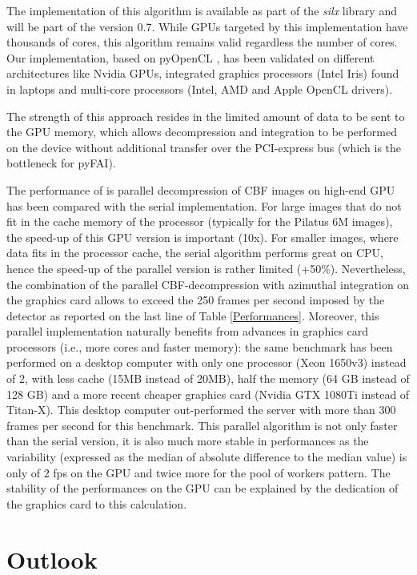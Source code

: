 \documentclass[preprint]{iucr}              %
\begin{document}
The implementation of this algorithm is available as part of the \textit{silx}
\cite{silx} library and will be part of the version 0.7.
While GPUs targeted by this implementation have thousands of
cores, this algorithm remains valid regardless the
number of cores.
Our implementation, based on pyOpenCL \cite{pyopencl}, 
has been validated on different architectures like Nvidia GPUs,
integrated graphics processors (Intel Iris) found in laptops and multi-core
processors (Intel, AMD and Apple OpenCL drivers).

The strength of this approach resides in the limited amount of
data to be sent to the GPU memory, which allows decompression and
integration to be performed on the device without additional
transfer over the PCI-express bus (which is the bottleneck for pyFAI).

The performance of is parallel decompression of CBF images on high-end GPU has
been compared with the serial implementation. 
For large images that do not fit in the cache memory of the
processor (typically for the Pilatus 6M images), the speed-up of this GPU
version is important (10x).
For smaller images, where data fits in the processor cache, the serial
algorithm performs great on CPU, hence the speed-up of the parallel version is
rather limited (+50\%). 
Nevertheless, the combination of the parallel CBF-decompression with azimuthal
integration on the graphics card allows to exceed the 250 frames per second
imposed by the detector as reported on the last line of Table
\ref{Performances}.
Moreover, this parallel implementation naturally benefits from advances in
graphics card processors (i.e., more cores and faster memory):
the same benchmark has been performed on a desktop computer with only one
processor (Xeon 1650v3) instead of 2, with less cache (15MB instead of 20MB),
half the memory (64 GB instead of 128 GB) and a more recent cheaper graphics card
(Nvidia GTX 1080Ti instead of Titan-X).
This desktop computer out-performed the server with more than
300 frames per second for this benchmark.
This parallel algorithm is not only faster than the serial version, it is also
much more stable in performances as the variability (expressed
as the median of absolute difference to the median value) is only of 2 fps on 
the GPU and twice more for the pool of workers pattern. 
The stability of the performances on the GPU can be explained by the dedication
of the graphics card to this calculation.

\section{Outlook}
\end{document}
